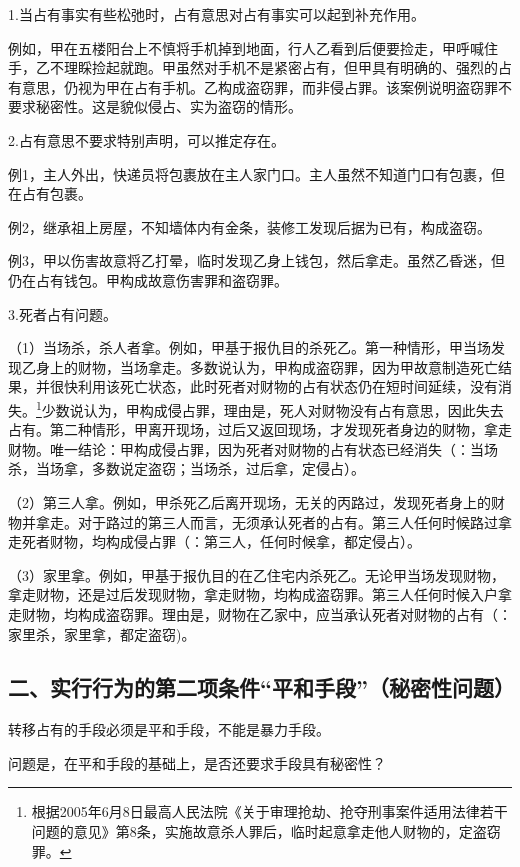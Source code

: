 1.当占有事实有些松弛时，占有意思对占有事实可以起到补充作用。

例如，甲在五楼阳台上不慎将手机掉到地面，行人乙看到后便要捡走，甲呼喊住手，乙不理睬捡起就跑。甲虽然对手机不是紧密占有，但甲具有明确的、强烈的占有意思，仍视为甲在占有手机。乙构成盗窃罪，而非侵占罪。该案例说明盗窃罪不要求秘密性。这是貌似侵占、实为盗窃的情形。

2.占有意思不要求特别声明，可以推定存在。

例1，主人外出，快递员将包裹放在主人家门口。主人虽然不知道门口有包裹，但在占有包裹。

例2，继承祖上房屋，不知墙体内有金条，装修工发现后据为已有，构成盗窃。

例3，甲以伤害故意将乙打晕，临时发现乙身上钱包，然后拿走。虽然乙昏迷，但仍在占有钱包。甲构成故意伤害罪和盗窃罪。

3.死者占有问题。

（1）当场杀，杀人者拿。例如，甲基于报仇目的杀死乙。第一种情形，甲当场发现乙身上的财物，当场拿走。多数说认为，甲构成盗窃罪，因为甲故意制造死亡结果，并很快利用该死亡状态，此时死者对财物的占有状态仍在短时间延续，没有消失。\footnote{根据2005年6月8日最高人民法院《关于审理抢劫、抢夺刑事案件适用法律若干问题的意见》第8条，实施故意杀人罪后，临时起意拿走他人财物的，定盗窃罪。}少数说认为，甲构成侵占罪，理由是，死人对财物没有占有意思，因此失去占有。第二种情形，甲离开现场，过后又返回现场，才发现死者身边的财物，拿走财物。唯一结论：甲构成侵占罪，因为死者对财物的占有状态已经消失（：当场杀，当场拿，多数说定盗窃；当场杀，过后拿，定侵占）。

（2）第三人拿。例如，甲杀死乙后离开现场，无关的丙路过，发现死者身上的财物并拿走。对于路过的第三人而言，无须承认死者的占有。第三人任何时候路过拿走死者财物，均构成侵占罪（：第三人，任何时候拿，都定侵占）。

（3）家里拿。例如，甲基于报仇目的在乙住宅内杀死乙。无论甲当场发现财物，拿走财物，还是过后发现财物，拿走财物，均构成盗窃罪。第三人任何时候入户拿走财物，均构成盗窃罪。理由是，财物在乙家中，应当承认死者对财物的占有（：家里杀，家里拿，都定盗窃)。

\subsection*{二、实行行为的第二项条件“平和手段”（秘密性问题）}

转移占有的手段必须是平和手段，不能是暴力手段。

问题是，在平和手段的基础上，是否还要求手段具有秘密性？

